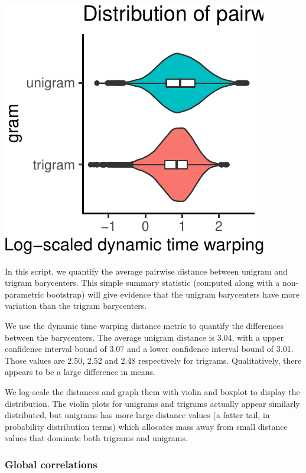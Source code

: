 \documentclass[man,floatsintext]{apa6}
\begin{document}
\includegraphics{figs/plot-1.pdf}

In this script, we quantify the average pairwise distance between unigram and trigram barycenters. This simple summary statistic (computed along with a non-parametric bootstrap) will give evidence that the unigram barycenters have more variation than the trigram barycenters.

We use the dynamic time warping distance metric to quantify the differences between the barycenters. The average unigram distance is 3.04, with a upper confidence interval bound of 3.07 and a lower confidence interval bound of 3.01. Those values are 2.50, 2.52 and 2.48 respectively for trigrams. Qualitatively, there appears to be a large difference in means.

We log-scale the distances and graph them with violin and boxplot to display the distribution. The violin plots for unigrams and trigrams actually appear similarly distributed, but unigrams has more large distance values (a fatter tail, in probability distribution terms) which allocates mass away from small distance values that dominate both trigrams and unigrams.

\hypertarget{global-correlations}{%
\subsubsection{Global correlations}\label{global-correlations}}
\end{document}
